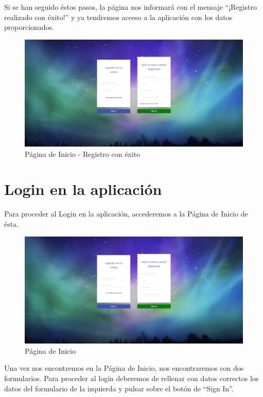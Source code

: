 \documentclass[11pt,openany]{book}
\begin{document}
Si se han seguido éstos pasos, la página nos informará con el mensaje ``¡Registro realizado con éxito!'' y ya tendremos acceso a la aplicación con los datos proporcionados.

\begin{figure}[H]
\centering
\includegraphics[totalheight=7cm]{manualUsuario/registroConExito.png}
\caption{Página de Inicio - Registro con éxito}
\end{figure}

\section{Login en la aplicación}

Para proceder al Login en la aplicación, accederemos a la Página de Inicio de ésta.

\begin{figure}[H]
\centering
\includegraphics[totalheight=7cm]{manualUsuario/paginaInicio.png}
\caption{Página de Inicio}
\end{figure}

Una vez nos encontremos en la Página de Inicio, nos encontraremos con dos formularios. Para proceder al login deberemos de rellenar con datos correctos los datos del formulario de la izquierda y pulsar sobre el botón de ``Sign In''.
\end{document}
